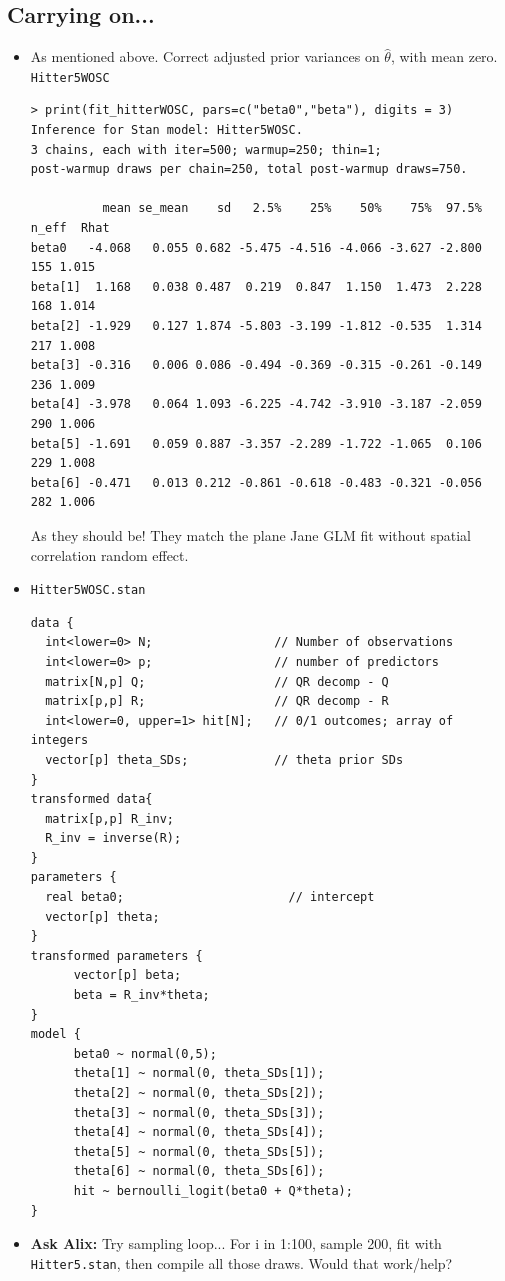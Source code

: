 \documentclass{article}
\begin{document}
\subsection*{Carrying on...}
\begin{itemize}
\item As mentioned above. Correct adjusted prior variances on $\hat{\theta}$, with mean zero. \verb|Hitter5WOSC|
\begin{verbatim}
> print(fit_hitterWOSC, pars=c("beta0","beta"), digits = 3)
Inference for Stan model: Hitter5WOSC.
3 chains, each with iter=500; warmup=250; thin=1; 
post-warmup draws per chain=250, total post-warmup draws=750.

          mean se_mean    sd   2.5%    25%    50%    75%  97.5% n_eff  Rhat
beta0   -4.068   0.055 0.682 -5.475 -4.516 -4.066 -3.627 -2.800   155 1.015
beta[1]  1.168   0.038 0.487  0.219  0.847  1.150  1.473  2.228   168 1.014
beta[2] -1.929   0.127 1.874 -5.803 -3.199 -1.812 -0.535  1.314   217 1.008
beta[3] -0.316   0.006 0.086 -0.494 -0.369 -0.315 -0.261 -0.149   236 1.009
beta[4] -3.978   0.064 1.093 -6.225 -4.742 -3.910 -3.187 -2.059   290 1.006
beta[5] -1.691   0.059 0.887 -3.357 -2.289 -1.722 -1.065  0.106   229 1.008
beta[6] -0.471   0.013 0.212 -0.861 -0.618 -0.483 -0.321 -0.056   282 1.006
\end{verbatim}
As they should be! They match the plane Jane GLM fit without spatial correlation random effect. 
\item \verb|Hitter5WOSC.stan|
\begin{verbatim}
data {                             
  int<lower=0> N;                 // Number of observations
  int<lower=0> p;                 // number of predictors
  matrix[N,p] Q;                  // QR decomp - Q
  matrix[p,p] R;                  // QR decomp - R
  int<lower=0, upper=1> hit[N];   // 0/1 outcomes; array of integers
  vector[p] theta_SDs;            // theta prior SDs
}
transformed data{
  matrix[p,p] R_inv;
  R_inv = inverse(R);
}
parameters {                
  real beta0;                       // intercept 
  vector[p] theta;
}
transformed parameters {
      vector[p] beta;
      beta = R_inv*theta;
}
model {  
      beta0 ~ normal(0,5);
      theta[1] ~ normal(0, theta_SDs[1]);
      theta[2] ~ normal(0, theta_SDs[2]);
      theta[3] ~ normal(0, theta_SDs[3]);
      theta[4] ~ normal(0, theta_SDs[4]);
      theta[5] ~ normal(0, theta_SDs[5]);
      theta[6] ~ normal(0, theta_SDs[6]);
      hit ~ bernoulli_logit(beta0 + Q*theta);
}
\end{verbatim}

\item {\bf Ask Alix:} Try sampling loop... For i in 1:100, sample 200, fit with \verb|Hitter5.stan|, then compile all those draws. Would that work/help?
\end{itemize}
\end{document}
